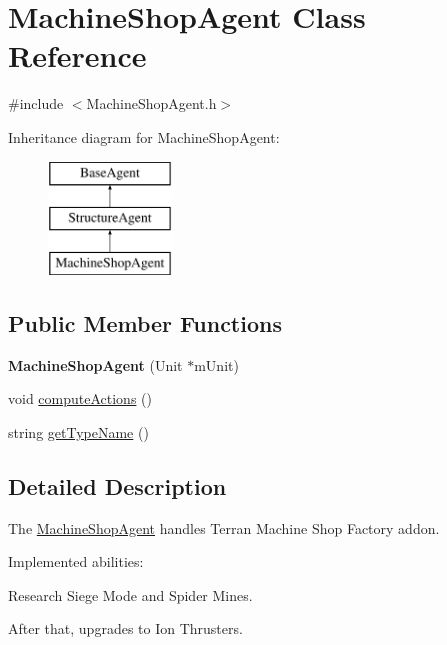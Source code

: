 \hypertarget{class_machine_shop_agent}{
\section{MachineShopAgent Class Reference}
\label{class_machine_shop_agent}
}


{\ttfamily \#include $<$MachineShopAgent.h$>$}

Inheritance diagram for MachineShopAgent:\begin{figure}[H]
\begin{center}
\leavevmode
\includegraphics[height=3.000000cm]{class_machine_shop_agent}
\end{center}
\end{figure}
\subsection*{Public Member Functions}
\begin{DoxyCompactItemize}
\item 
\hypertarget{class_machine_shop_agent_a7e9f6d3535ed91eb04e7c262f3a94502}{
{\bfseries MachineShopAgent} (Unit $\ast$mUnit)}
\label{class_machine_shop_agent_a7e9f6d3535ed91eb04e7c262f3a94502}

\item 
void \hyperlink{class_machine_shop_agent_a2779335220a25f218e60398f4cbf2226}{computeActions} ()
\item 
string \hyperlink{class_machine_shop_agent_abf022f93425ad5ec2878e1ae4e66f468}{getTypeName} ()
\end{DoxyCompactItemize}


\subsection{Detailed Description}
The \hyperlink{class_machine_shop_agent}{MachineShopAgent} handles Terran Machine Shop Factory addon.

Implemented abilities:
\begin{DoxyItemize}
\item Research Siege Mode and Spider Mines.
\item After that, upgrades to Ion Thrusters.
\end{DoxyItemize}

